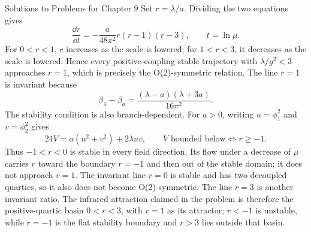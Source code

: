\begin{bankssolutions}{Solutions to Problems for Chapter 9}
Set $r=\lambda/a$.  Dividing the two equations gives
\[
 \frac{\dd r}{\dd t}
 =-\frac{a}{48\pi^2}r(r-1)(r-3),
 \qquad t=\ln\mu.
\]
For $0<r<1$, $r$ increases as the scale is lowered; for $1<r<3$, it
decreases as the scale is lowered.  Hence every positive-coupling stable
trajectory with $\lambda/g^2<3$ approaches $r=1$, which is precisely the
O(2)-symmetric relation.  The line $r=1$ is invariant because
\[
 \beta_\lambda-\beta_a
 =\frac{(\lambda-a)(\lambda+3a)}{16\pi^2}.
\]
The stability condition is also branch-dependent.  For $a>0$, writing
$u=\phi_1^2$ and $v=\phi_2^2$ gives
\[
 24V=a(u^2+v^2)+2\lambda uv,
 \qquad V\text{ bounded below}\Longleftrightarrow r\geq-1.
\]
Thus $-1<r<0$ is stable in every field direction.  Its flow under a decrease
of $\mu$ carries $r$ toward the boundary $r=-1$ and then out of the stable
domain; it does not approach $r=1$.  The invariant line $r=0$ is stable and
has two decoupled quartics, so it also does not become O(2)-symmetric.  The
line $r=3$ is another invariant ratio.  The infrared attraction claimed in
the problem is therefore the positive-quartic basin $0<r<3$, with $r=1$ as
its attractor; $r<-1$ is unstable, while $r=-1$ is the flat stability
boundary and $r>3$ lies outside that basin.


\end{bankssolutions}

